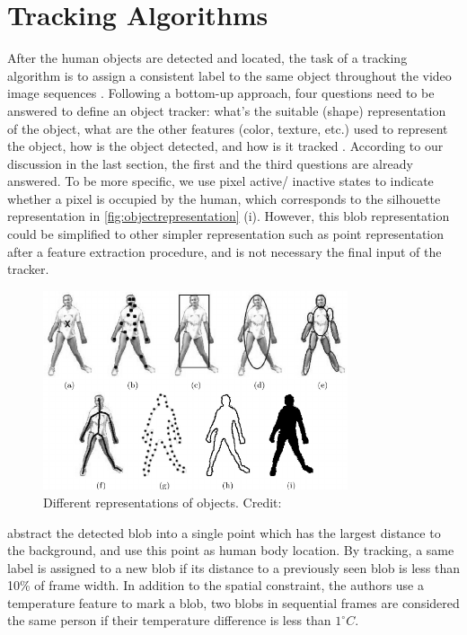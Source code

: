 \section{Tracking Algorithms}
After the human objects are detected and located, the task of a tracking algorithm is to assign a consistent label to the same object throughout the video image sequences \cite{tang2010hybrid}. Following a bottom-up approach, four questions need to be answered to define an object tracker: what's the suitable (shape) representation of the object, what are the other features (color, texture, etc.) used to represent the object, how is the object detected, and how is it tracked \cite{trackingsurvey}. According to our discussion in the last section, the first and the third questions are already answered. To be more specific, we use pixel active/ inactive states to indicate whether a pixel is occupied by the human, which corresponds to the silhouette representation in \autoref{fig:objectrepresentation} (i). However, this blob representation could be simplified to other simpler representation such as point representation after a feature extraction procedure, and is not necessary the final input of the tracker.
\begin{figure}
  \centering
  \includegraphics[width=0.8\textwidth]{figures/Object-representations.png}
  \caption{Different representations of objects. Credit: \cite{trackingsurvey}}\label{fig:objectrepresentation}
\end{figure}

\citeauthor{firstflow} \cite{firstflow} abstract the detected blob into a single point which has the largest distance to the background, and use this point as human body location. By tracking, a same label is assigned to a new blob if its distance to a previously seen blob is less than 10\% of frame width. In addition to the spatial constraint, the authors use a temperature feature to mark a blob, two blobs in sequential frames are considered the same person if their temperature difference is less than $1^\circ C$.

